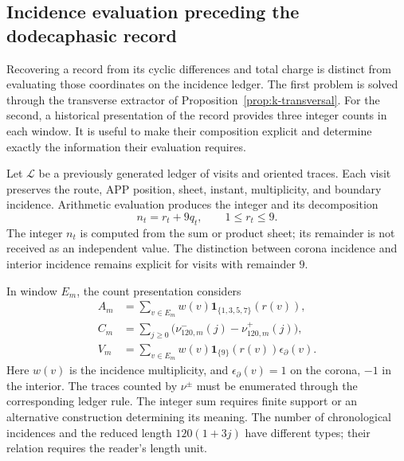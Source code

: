 \subsection{Incidence evaluation preceding the dodecaphasic record}
\label{subsec:registro-evaluacion-incidencial}

Recovering a record from its cyclic differences and
total charge is distinct from evaluating those coordinates
on the incidence ledger. The first problem is solved through the
transverse extractor of Proposition~\ref{prop:k-transversal}.
For the second, a historical presentation of the
record provides three integer counts in each window. It is useful
to make their composition explicit and determine exactly the information
their evaluation requires.

Let \(\mathscr L\) be a previously generated ledger of visits and oriented
traces. Each visit preserves the route, APP position, sheet,
instant, multiplicity, and boundary incidence. Arithmetic evaluation
produces the integer and its decomposition
\[
 n_t=r_t+9q_t,\qquad 1\leq r_t\leq9.
\]
The integer \(n_t\) is computed from the sum or product sheet; its
remainder is not received as an independent value. The distinction between
corona incidence and interior incidence remains explicit for visits
with remainder \(9\).

In window \(E_m\), the count presentation considers
\begin{align}
 A_m&=\sum_{v\in E_m}w(v)
             \mathbf1_{\{1,3,5,7\}}(r(v)),\\
 C_m&=\sum_{j\geq0}\bigl(\nu^-_{120,m}(j)-\nu^+_{120,m}(j)\bigr),\\
 V_m&=\sum_{v\in E_m}w(v)\mathbf1_{\{9\}}(r(v))\epsilon_\partial(v).
\end{align}
Here \(w(v)\) is the incidence multiplicity, and
\(\epsilon_\partial(v)=1\) on the corona, \(-1\) in the interior.
The traces counted by \(\nu^\pm\) must be enumerated through the
corresponding ledger rule. The integer sum requires finite support or an
alternative construction determining its meaning. The number of
chronological incidences and the reduced length \(120(1+3j)\) have
different types; their relation requires the reader's length unit.

